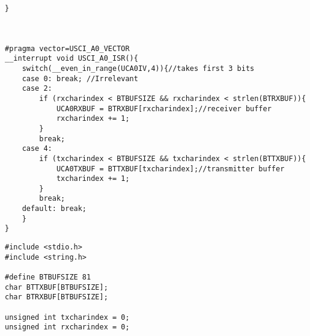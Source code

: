 \begin{code}
\begin{verbatim}
}



#pragma vector=USCI_A0_VECTOR
__interrupt void USCI_A0_ISR(){
    switch(__even_in_range(UCA0IV,4)){//takes first 3 bits
    case 0: break; //Irrelevant
    case 2:
        if (rxcharindex < BTBUFSIZE && rxcharindex < strlen(BTRXBUF)){
            UCA0RXBUF = BTRXBUF[rxcharindex];//receiver buffer
            rxcharindex += 1;
        }
        break;
    case 4:
        if (txcharindex < BTBUFSIZE && txcharindex < strlen(BTTXBUF)){
            UCA0TXBUF = BTTXBUF[txcharindex];//transmitter buffer
            txcharindex += 1;
        }
        break;
    default: break;
    }
}
 \end{verbatim}
\end{code}
\begin{code}
\label{code:main-unit-bluetooth.h}
 \begin{verbatim}
#include <stdio.h>
#include <string.h>

#define BTBUFSIZE 81
char BTTXBUF[BTBUFSIZE];
char BTRXBUF[BTBUFSIZE];

unsigned int txcharindex = 0;
unsigned int rxcharindex = 0;


\end{verbatim}
\end{code}
